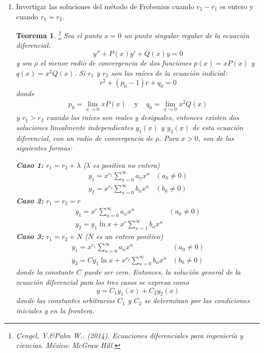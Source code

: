 \documentclass{article}
\newtheorem{teo}{Teorema}
\begin{document}
\begin{enumerate}
        \item {
            Invertigar las soluciones del método de Frobenius cuando $r_2 - r_1$
            es entero y cuando $r_1 = r_2$.

            \color{azul}
            \begin{teo}
                \footnote{\c{C}engel, Y.\&Palm W.. (2014). Ecuaciones diferenciales para ingeniería y ciencias. México:
                McGraw Hill.}
                Sea el punto $x=0$ un punto singular regular de la ecuación diferencial:
                $$y''+P(x)y'+Q(x)y=0$$
                y sea $\rho$ el menor radio de convergencia de dos funciones $p(x)=xP(x)$ y $q(x)=x^2Q(x)$. Si $r_1$ y
                $r_2$ son las raíces de la ecuación indicial:
                $$r^2+(p_0-1)r+q_0=0$$
                donde
                \begin{eqnarray*}
                    p_0=\lim_{x\to 0}xP(x) & \text{ y } & q_0=\lim_{x\to 0}x^2Q(x)
                \end{eqnarray*}
                y $r_1>r_2$ cuando las raíces son reales y desiguales, entonces existen dos soluciones linealmente
                independientes $y_1(x)$ y $y_2(x)$ de esta ecuación diferencial, con un radio de convergencia de
                $\rho$. Para $x>0$, son de las siguientes formas:

                {\bf Caso 1:} $r_1=r_2+\lambda$ ($\lambda$ es positiva no entera)
                \begin{eqnarray*}
                    y_1=x^{r_1}\sum_{n=0}^{\infty}{a_nx^n} & (a_0\neq 0) \\
                    y_2=x^{r_2}\sum_{n=0}^{\infty}{b_nx^n} & (b_0\neq 0) 
                \end{eqnarray*}
                {\bf Caso 2:} $r_1=r_2=r$
                \begin{eqnarray*}
                    y_1=x^{r}\sum_{n=0}^{\infty}{a_nx^n} & (a_0\neq 0) \\
                    y_2=y_1\ln{x}+x^{r}\sum_{n=1}^{\infty}{b_nx^n}
                \end{eqnarray*}
                {\bf Caso 3:} $r_1=r_2+N$ ($N$ es un entero positivo)
                \begin{eqnarray*}
                    y_1=x^{r_1}\sum_{n=0}^{\infty}{a_nx^n} & (a_0\neq 0) \\
                    y_2=Cy_1\ln{x}+x^{r_2}\sum_{n=0}^{\infty}{b_nx^n} & (b_0\neq 0)
                \end{eqnarray*}
                donde la constante $C$ puede ser cero. Entonces, la solución general de la ecuación diferencial para
                los tres casos se expresa como
                $$y=C_1y_1(x)+C_2y_2(x)$$
                donde las constantes arbitrarias $C_1$ y $C_2$ se determinan por las condiciones iniciales y en la
                frontera.
            \end{teo}
        }


\end{enumerate}
\end{document}
